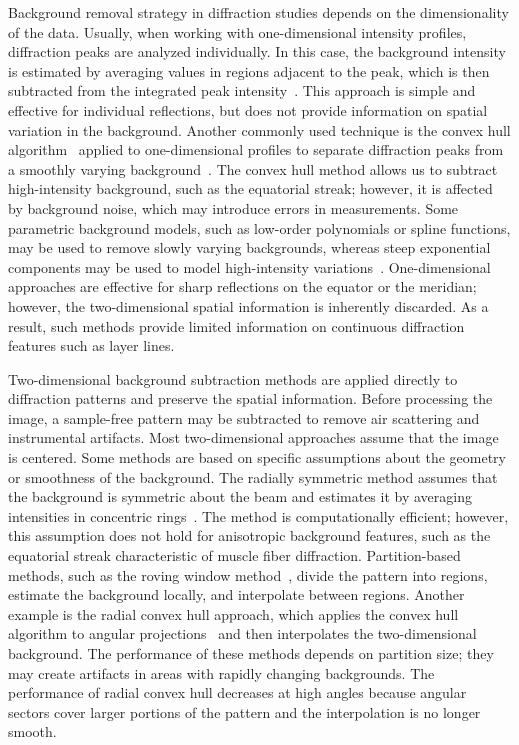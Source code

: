 \documentclass[journal,article,submit,moreauthors]{Definitions/mdpi}
\begin{document}
Background removal strategy in diffraction studies depends on the dimensionality of the data. Usually, when working with one-dimensional intensity profiles, diffraction peaks are analyzed individually. In this case, the background intensity is estimated by averaging values in regions adjacent to the peak, which is then subtracted from the integrated peak intensity~\citep{He2018}. This approach is simple and effective for individual reflections, but does not provide information on spatial variation in the background. Another commonly used technique is the convex hull algorithm~\citep{jarvis1973convex_hull} applied to one-dimensional profiles to separate diffraction peaks from a smoothly varying background~\citep{lee2019musclex}. The convex hull method allows us to subtract high-intensity background, such as the equatorial streak; however, it is affected by background noise, which may introduce errors in measurements. Some parametric background models, such as low-order polynomials or spline functions, may be used to remove slowly varying backgrounds, whereas steep exponential components may be used to model high-intensity variations~\citep{rajkumar2007fibrefix}. One-dimensional approaches are effective for sharp reflections on the equator or the meridian; however, the two-dimensional spatial information is inherently discarded. As a result, such methods provide limited information on continuous diffraction features such as layer lines.

Two-dimensional background subtraction methods are applied directly to diffraction patterns and preserve the spatial information. Before processing the image, a sample-free pattern may be subtracted to remove air scattering and instrumental artifacts. Most two-dimensional approaches assume that the image is centered. Some methods are based on specific assumptions about the geometry or smoothness of the background. The radially symmetric method assumes that the background is symmetric about the beam and estimates it by averaging intensities in concentric rings~\citep{rajkumar2007fibrefix}. The method is computationally efficient; however, this assumption does not hold for anisotropic background features, such as the equatorial streak characteristic of muscle fiber diffraction. Partition-based methods, such as the roving window method~\citep{rajkumar2007fibrefix}, divide the pattern into regions, estimate the background locally, and interpolate between regions. Another example is the radial convex hull approach, which applies the convex hull algorithm to angular projections~\citep{lee2019musclex} and then interpolates the two-dimensional background. The performance of these methods depends on partition size; they may create artifacts in areas with rapidly changing backgrounds. The performance of radial convex hull decreases at high angles because angular sectors cover larger portions of the pattern and the interpolation is no longer smooth.
\end{document}
